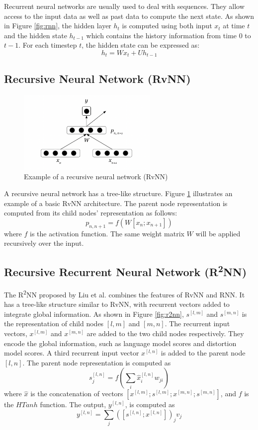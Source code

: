 \documentclass[12pt,a4paper,twoside,openright]{report}
\begin{document}
Recurrent neural networks are usually used to deal with sequences. They allow access to the input data as well as past data to compute the next state. As shown in Figure \ref{fig:rnn}, the hidden layer $h_t$ is computed using both input $x_t$ at time $t$ and the hidden state $h_{t-1}$ which contains the history information from time 0 to $t-1$. For each timestep $t$, the hidden state can be expressed as:
\[ h_t = Wx_t + Uh_{t-1} \]

\subsection{Recursive Neural Network (RvNN)}

\begin{figure}[ht]
\centering
\includegraphics[width=0.6\textwidth]{images/rvnn.png}
\caption{Example of a recursive neural network (RvNN)}
\label{fig:rvnn}
\end{figure}

A recursive neural network has a tree-like structure. Figure \ref{fig:rvnn} illustrates an example of a basic RvNN architecture. The parent node representation is computed from its child nodes' representation as follows:
\[ p_{n, n+1} = f(W[x_n; x_{n+1}]) \]
where $f$ is the activation function. The same weight matrix $W$ will be applied recursively over the input.

\subsection{\texorpdfstring{Recursive Recurrent Neural Network (R\textsuperscript{2}NN)}{Recursive Recurrent Neural Network (R2NN)}}
The R\textsuperscript{2}NN proposed by Liu et al.\cite{r2nn} combines the features of RvNN and RNN. It has a tree-like structure similar to RvNN, with recurrent vectors added to integrate global information. As shown in Figure \ref{fig:r2nn}, $s^{[l, m]}$ and $s^{[m, n]}$ is the representation of child nodes $[l, m]$ and $[m, n]$. The recurrent input vectors, $x^{[l, m]}$ and $x^{[m, n]}$ are added to the two child nodes respectively. They encode the global information, such as language model scores and distortion model scores. A third recurrent input vector $x^{[l, n]}$ is added to the parent node $[l, n]$. The parent node representation is computed as
\[ s_j^{[l, n]} = f(\sum_{i} \hat{x}_i^{[l, n]}w_{ji}) \]
where $\hat{x}$ is the concatenation of vectors $[x^{[l, m]}; s^{[l, m]}; x^{[m, n]}; s^{[m, n]}]$, and $f$ is the $HTanh$ function. The output, $y^{[l, n]}$, is computed as
\[ y^{[l, n]} = \sum_{j} ([s^{[l, n]}; x^{[l, n]}])_{j}v_j \]
\end{document}
